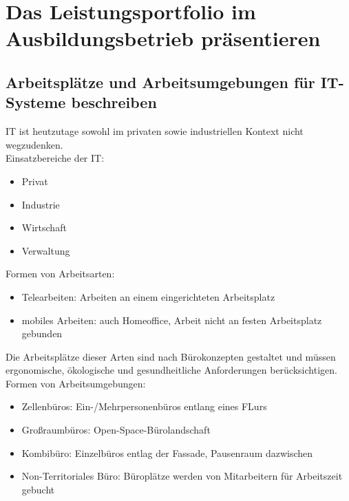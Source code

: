 \section{Das Leistungsportfolio im Ausbildungsbetrieb präsentieren}
\subsection{Arbeitsplätze und Arbeitsumgebungen für IT-Systeme beschreiben}
    \begin{subindent}
        IT ist heutzutage sowohl im privaten sowie industriellen Kontext nicht wegzudenken. \\
        Einsatzbereiche der IT:
    \end{subindent}
    
    \begin{itemize}[leftmargin=2.5cm, topsep=0.3em, itemsep=0.1em, parsep=0.5em]
        \item Privat
        \item Industrie
        \item Wirtschaft
        \item Verwaltung
    \end{itemize}
    
    \begin{subindent}
        Formen von Arbeitsarten:
    \end{subindent}
    
    \begin{itemize}[leftmargin=2.5cm, topsep=0.3em, itemsep=0.1em, parsep=0.5em]
        \item Telearbeiten: Arbeiten an einem eingerichteten Arbeitsplatz
        \item mobiles Arbeiten: auch Homeoffice, Arbeit nicht an festen Arbeitsplatz gebunden
    \end{itemize}
    
    \begin{subindent}
        Die Arbeitsplätze dieser Arten sind nach Bürokonzepten gestaltet und müssen ergonomische, ökologische und gesundheitliche Anforderungen berücksichtigen. \\
        Formen von Arbeitsumgebungen:
    \end{subindent}
    
    \begin{itemize}[leftmargin=2.5cm, topsep=0.3em, itemsep=0.1em, parsep=0.5em]
        \item Zellenbüros: Ein-/Mehrpersonenbüros entlang eines FLurs
        \item Großraumbüros: Open-Space-Bürolandschaft
        \item Kombibüro: Einzelbüros entlag der Fassade, Pausenraum dazwischen
        \item Non-Territoriales Büro: Büroplätze werden von Mitarbeitern für Arbeitszeit gebucht
    \end{itemize}
    
